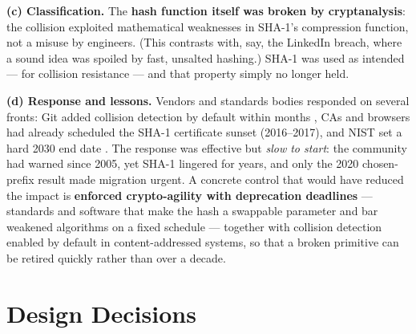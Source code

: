 \documentclass[11pt,a4paper]{article}
\begin{document}
\textbf{(c) Classification.} The \textbf{hash function itself was broken by cryptanalysis}: the collision
exploited mathematical weaknesses in SHA-1's compression function, not a misuse by engineers. (This
contrasts with, say, the LinkedIn breach, where a sound idea was spoiled by fast, unsalted hashing.)
SHA-1 was used as intended --- for collision resistance --- and that property simply no longer held.

\textbf{(d) Response and lessons.} Vendors and standards bodies responded on several fronts: Git added
collision detection by default within months \cite{git213}, CAs and browsers had already scheduled the
SHA-1 certificate sunset (2016--2017), and NIST set a hard 2030 end date \cite{nistsha1}. The response
was effective but \emph{slow to start}: the community had warned since 2005, yet SHA-1 lingered for years,
and only the 2020 chosen-prefix result made migration urgent. A concrete control that would have reduced
the impact is \textbf{enforced crypto-agility with deprecation deadlines} --- standards and software that
make the hash a swappable parameter and bar weakened algorithms on a fixed schedule --- together with
collision detection enabled by default in content-addressed systems, so that a broken primitive can be
retired quickly rather than over a decade.

\section*{Design Decisions}
\end{document}
